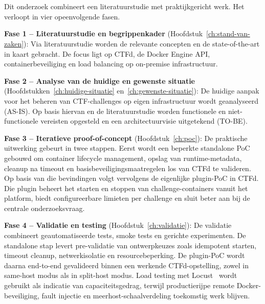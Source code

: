 
\chapter{}%
\label{ch:methodologie}

Dit onderzoek combineert een literatuurstudie met praktijkgericht werk. Het verloopt in vier opeenvolgende fasen.

\textbf{Fase 1 -- Literatuurstudie en begrippenkader} (Hoofdstuk~\ref{ch:stand-van-zaken}): Via literatuurstudie worden de relevante concepten en de state-of-the-art in kaart gebracht. De focus ligt op CTFd, de Docker Engine API, containerbeveiliging en load balancing op on-premise infrastructuur.

\textbf{Fase 2 -- Analyse van de huidige en gewenste situatie} (Hoofdstukken~\ref{ch:huidige-situatie} en~\ref{ch:gewenste-situatie}): De huidige aanpak voor het beheren van CTF-challenges op eigen infrastructuur wordt geanalyseerd (AS-IS). Op basis hiervan en de literatuurstudie worden functionele en niet-functionele vereisten opgesteld en een architectuurvisie uitgetekend (TO-BE).

\textbf{Fase 3 -- Iteratieve proof-of-concept} (Hoofdstuk~\ref{ch:poc}): De praktische uitwerking gebeurt in twee stappen. Eerst wordt een beperkte standalone PoC gebouwd om container lifecycle management, opslag van runtime-metadata, cleanup na timeout en basisbeveiligingsmaatregelen los van CTFd te valideren. Op basis van die bevindingen volgt vervolgens de eigenlijke plugin-PoC in CTFd. Die plugin beheert het starten en stoppen van challenge-containers vanuit het platform, biedt configureerbare limieten per challenge en sluit beter aan bij de centrale onderzoeksvraag.

\textbf{Fase 4 -- Validatie en testing} (Hoofdstuk~\ref{ch:validatie}): De validatie combineert geautomatiseerde tests, smoke tests en gerichte experimenten. De standalone stap levert pre-validatie van ontwerpkeuzes zoals idempotent starten, timeout cleanup, netwerkisolatie en resourcebeperking. De plugin-PoC wordt daarna end-to-end gevalideerd binnen een werkende CTFd-opstelling, zowel in same-host modus als in split-host modus. Load testing met Locust~\autocite{Locust} wordt gebruikt als indicatie van capaciteitsgedrag, terwijl productierijpe remote Docker-beveiliging, fault injectie en meerhost-schaalverdeling toekomstig werk blijven.
